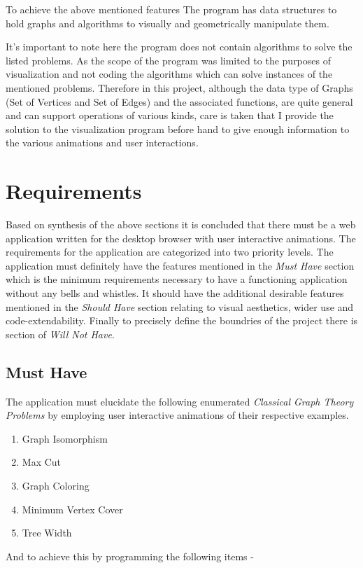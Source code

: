 To achieve the above mentioned features The program has data structures to hold
graphs and algorithms to visually and geometrically manipulate them. 

It's important to note here the program does not contain algorithms to solve
the listed problems. As the scope of the program was limited to the purposes of
visualization and not coding the algorithms which can solve instances of the
mentioned problems.  Therefore in this project, although the data type of
Graphs (Set of Vertices and Set of Edges) and the associated functions, are
quite general and can support operations of various kinds, care is taken that I
provide the solution to the visualization program before hand to give enough
information to the various animations and user interactions.


\section{Requirements}
Based on synthesis of the above sections it is concluded that there must be a
web application written for the desktop browser with user interactive
animations. The requirements for the application are categorized into two
priority levels. The application must definitely have the features mentioned
in the \emph{Must Have} section which is the minimum requirements necessary
to have a functioning application without any bells and whistles. It should
have the additional desirable features mentioned in the \emph{Should Have}
section relating to visual aesthetics, wider use and code-extendability.
Finally to precisely define the boundries of the project there is section
of \emph{Will Not Have}.

\subsection{Must Have}
The application must elucidate the following enumerated \emph{Classical Graph Theory
Problems} by employing user interactive animations of their respective examples.
\begin{enumerate}
\item Graph Isomorphism
\item Max Cut
\item Graph Coloring
\item Minimum Vertex Cover
\item Tree Width
\end{enumerate}

And to achieve this by programming the following items -


